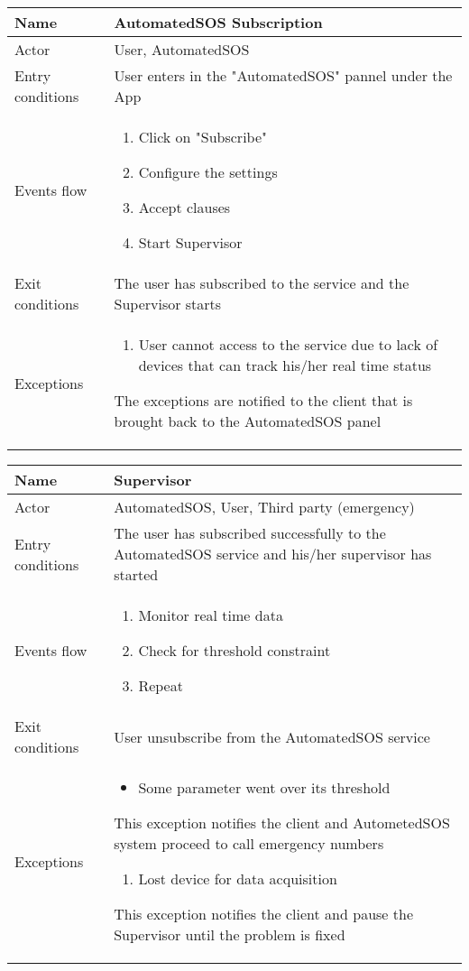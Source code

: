 \begin{table}[]
\begin{tabular}{|l|p{12cm}|}
\hline
Name             & AutomatedSOS Subscription \\ \hline
Actor            & User, AutomatedSOS \\ \hline
Entry conditions & User enters in the "AutomatedSOS" pannel under the App \\ \hline
Events flow      & \begin{enumerate}
\item Click on "Subscribe"
\item Configure the settings
\item Accept clauses
\item Start Supervisor
\end{enumerate} \\ \hline
Exit conditions  & The user has subscribed to the service and the Supervisor starts \\ \hline
Exceptions       & \begin{enumerate}
\item User cannot access to the service due to lack of devices that can track his/her real time status
\end{enumerate} The exceptions are notified to the client that is brought back to the AutomatedSOS panel\\ \hline
\end{tabular}
\end{table}

\begin{table}[]
\begin{tabular}{|l|p{12cm}|}
\hline
Name             & Supervisor \\ \hline
Actor            & AutomatedSOS, User, Third party (emergency) \\ \hline
Entry conditions & The user has subscribed successfully to the AutomatedSOS service and his/her supervisor has started \\ \hline
Events flow      & \begin{enumerate}
\item Monitor real time data
\item Check for threshold constraint
\item Repeat
\end{enumerate} \\ \hline
Exit conditions  & User unsubscribe from the AutomatedSOS service \\ \hline
Exceptions       & \begin{itemize}
\item Some parameter went over its threshold
\end{itemize} This exception notifies the client and AutometedSOS system proceed to call emergency numbers \begin{enumerate}
\item Lost device for data acquisition
\end{enumerate} This exception notifies the client and pause the Supervisor until the problem is fixed \\ \hline
\end{tabular}
\end{table}

